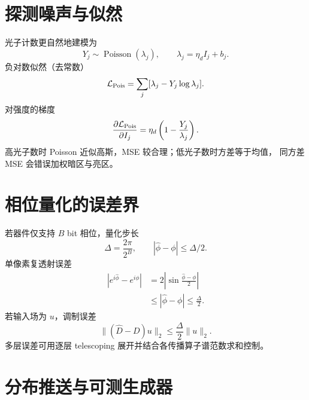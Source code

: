 \documentclass[11pt]{article}
\numberwithin{equation}{section}
\newcommand{\1}{\mathbf{1}}
\newcommand{\cL}{\mathcal{L}}
\begin{document}
\section{探测噪声与似然}

光子计数更自然地建模为
\begin{equation}
 Y_j\sim\operatorname{Poisson}(\lambda_j),
 \qquad \lambda_j=\eta_d I_j+b_j.
\end{equation}
负对数似然（去常数）
\begin{equation}
 \cL_{\rm Pois}=\sum_j[\lambda_j-Y_j\log\lambda_j].
\end{equation}
对强度的梯度
\begin{equation}
 \frac{\partial\cL_{\rm Pois}}{\partial I_j}
 =\eta_d\left(1-\frac{Y_j}{\lambda_j}\right).
\end{equation}
高光子数时 Poisson 近似高斯，MSE 较合理；低光子数时方差等于均值，
同方差 MSE 会错误加权暗区与亮区。

\section{相位量化的误差界}

若器件仅支持 $B$ bit 相位，量化步长
\begin{equation}
 \Delta=\frac{2\pi}{2^B},\qquad |\widehat\phi-\phi|\le\Delta/2.
\end{equation}
单像素复透射误差
\begin{align}
 |e^{i\widehat\phi}-e^{i\phi}|
 &=2\left|\sin\frac{\widehat\phi-\phi}{2}\right|\\
 &\le|\widehat\phi-\phi|\le\frac\Delta2.
\end{align}
若输入场为 $u$，调制误差
\begin{equation}
 \|(\widehat D-D)u\|_2\le\frac\Delta2\|u\|_2.
\end{equation}
多层误差可用逐层 telescoping 展开并结合各传播算子谱范数求和控制。

\section{分布推送与可测生成器}
\end{document}
